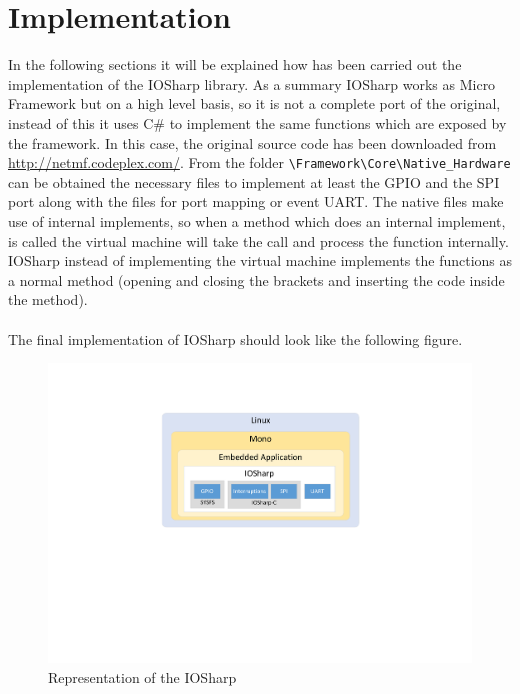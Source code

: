 \section{Implementation}\label{S:Implementation}
In the following sections it will be explained how has been carried out the implementation of the IOSharp library. As a summary IOSharp works as Micro Framework but on a high level basis, so it is not a complete port of the original, instead of this it uses C\# to implement the same functions which are exposed by the framework. In this case, the original source code has been downloaded from \url{http://netmf.codeplex.com/}. From the folder \verb!\Framework\Core\Native_Hardware! can be obtained the necessary files to implement at least the GPIO and the SPI port along with the files for port mapping or event UART. The native files make use of internal implements, so when a method which does an internal implement, is called the virtual machine will take the call and process the function internally. IOSharp instead of implementing the virtual machine implements the functions as a normal method (opening and closing the brackets and inserting the code inside the method).
\\
\\
The final implementation of IOSharp should look like the following figure.
\begin{figure}[H]\begin{center}
 \centering
  \captionsetup{justification=centering}
  \includegraphics[scale=0.75]{pictures/iosharp/iosharp-schema2}
  \caption{Representation of the IOSharp \label{fig:interrupt-schema}}
\end{center}\end{figure}

